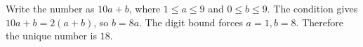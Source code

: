Write the number as $10a+b$, where $1\le a\le9$ and $0\le b\le9$. The condition gives $10a+b=2(a+b)$, so $b=8a$. The digit bound forces $a=1,b=8$. Therefore the unique number is $\boxed{18}$.
